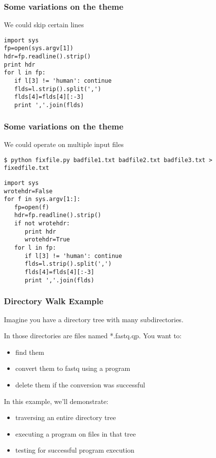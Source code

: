 \documentclass[10pt]{beamer}
\begin{document}
\begin{frame}[fragile]
\frametitle{Some variations on the theme}

We could skip certain lines

\begin{verbatim}
import sys
fp=open(sys.argv[1])
hdr=fp.readline().strip()
print hdr
for l in fp:
   if l[3] != 'human': continue
   flds=l.strip().split(',')
   flds[4]=flds[4][:-3]
   print ','.join(flds)
\end{verbatim}
\end{frame}

\begin{frame}[fragile]
\frametitle{Some variations on the theme}

We could operate on multiple input files
\begin{verbatim}
$ python fixfile.py badfile1.txt badfile2.txt badfile3.txt > fixedfile.txt
\end{verbatim}

\begin{verbatim}
import sys
wrotehdr=False
for f in sys.argv[1:]:
   fp=open(f)
   hdr=fp.readline().strip()
   if not wrotehdr:
      print hdr
      wrotehdr=True
   for l in fp:
      if l[3] != 'human': continue
      flds=l.strip().split(',')
      flds[4]=flds[4][:-3]
      print ','.join(flds)
\end{verbatim}
\end{frame}


\begin{frame}[fragile]
\frametitle{Directory Walk Example}

Imagine you have a directory tree with many subdirectories.  
\vspace{2mm}

In those directories are files named *.fastq.qp.  You want to:
\begin{itemize}
\item find them
\item convert them to fastq using a program
\item delete them if the conversion was successful
\end{itemize}

In this example, we'll demonstrate:

\begin{itemize}
\item traversing an entire directory tree
\item executing a program on files in that tree
\item testing for successful program execution
\end{itemize}

\end{frame}
\end{document}
